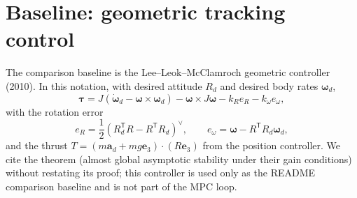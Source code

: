 \documentclass[11pt]{article}
\begin{document}
\section{Baseline: geometric tracking control}

The comparison baseline is the Lee--Leok--McClamroch geometric controller (2010). In this
notation, with desired attitude $R_d$ and desired body rates $\bm\omega_d$,
\begin{equation}
  \bm\tau = J \left( \dot{\bm\omega}_d - \bm\omega \times \bm\omega_d \right) - \bm\omega
  \times J \bm\omega - k_R e_R - k_\omega e_\omega,
  \label{eq:geom}
\end{equation}
with the rotation error
\begin{equation}
  e_R = \frac12 \left( R_d^{\mathsf T} R - R^{\mathsf T} R_d \right)^\vee,
  \qquad e_\omega = \bm\omega - R^{\mathsf T} R_d \bm\omega_d,
\end{equation}
and the thrust $T = (m \bm a_d + m g \bm e_3) \cdot (R \bm e_3)$ from the position
controller. We cite the theorem (almost global asymptotic stability under their gain
conditions) without restating its proof; this controller is used only as the README
comparison baseline and is not part of the MPC loop.



\end{document}
